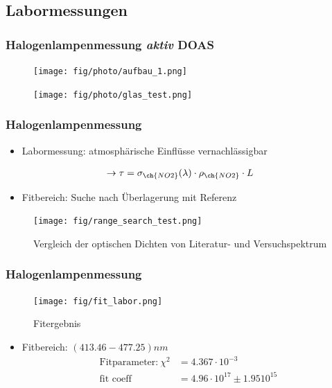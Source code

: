 \documentclass{beamer}
\begin{document}
\begin{frame}
    \section{Labormessungen}
    \frametitle{Halogenlampenmessung \textit{aktiv} DOAS}

    \begin{figure}[h]
        \texttt{[image: fig/photo/aufbau\_1.png]}
    \end{figure}

    \begin{figure}[h]
        \texttt{[image: fig/photo/glas\_test.png]}
    \end{figure}
\end{frame}

\begin{frame} 
    \frametitle{Halogenlampenmessung}
	\begin{itemize}
    	\item Labormessung: atmosphärische Einflüsse vernachlässigbar
	\end{itemize}
	\begin{align}
	 	\to \tau = \sigma_{\ch{NO2}}(\lambda) \cdot \rho_{\ch{NO2}} \cdot L
	\end{align}
    \begin{itemize}
    	\item Fitbereich: Suche nach Überlagerung mit  Referenz
	\end{itemize}
	\begin{figure}[h]
		\texttt{[image: fig/range\_search\_test.png]}
		\caption{Vergleich der optischen Dichten von Literatur- und Versuchspektrum}
	\end{figure}
\end{frame} 

\begin{frame}
	\frametitle{Halogenlampenmessung}
     \begin{figure}[h]
    	\texttt{[image: fig/fit\_labor.png]}
    	\caption{Fitergebnis}
    \end{figure}
    \begin{itemize} 
    	\item Fitbereich: $(413.46 - 477.25) \si{nm}$
    		\begin{align}
    		   \text{Fitparameter:}\ \chi^2 &= 4.367 \cdot 10^{-3}\\
    		   \text{fit coeff} &= 4.96 \cdot 10^{17} \pm 1.95 10^{15}
    		\end{align}
    \end{itemize}
\end{frame} 
\end{document}
